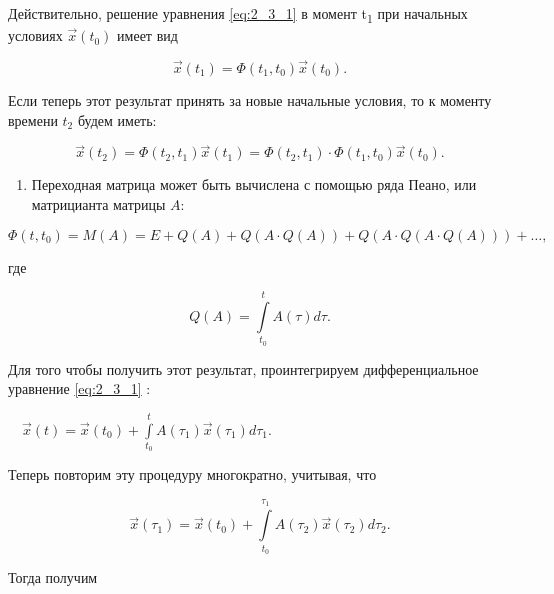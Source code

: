 		Действительно, решение уравнения \eqref{eq:2_3_1} %
		в момент {t}\textsubscript{1} при начальных условиях  $\vec x(t_0)$
		имеет вид


\begin{equation*}
\vec x(t_1)=\Phi (t_1,t_0)\vec x(t_0).
\end{equation*}

		Если теперь этот результат принять за новые начальные условия, то к моменту времени  $t_2$ будем иметь:


\begin{equation*}
\vec x(t_2)=\Phi (t_2,t_1)\vec x(t_1)=\Phi (t_2,t_1)\cdot \Phi (t_1,t_0)\vec x(t_0).
\end{equation*}
\liststyleWWviiiNumlxviii
\setcounter{saveenum}{\value{enumi}}
\begin{enumerate}
	\setcounter{enumi}{\value{saveenum}}
	\item 
			Переходная матрица может быть вычислена с помощью ряда Пеано, или матрицианта матрицы  $A$:
	
\end{enumerate}
\begin{equation*}
\Phi (t,t_0)=M(A)=E+Q(A)+Q(A\cdot Q(A))+Q(A\cdot Q(A\cdot Q(A)))+\ldots ,
\end{equation*}

		где


\begin{equation*}
Q(A)=\overset t{\underset{t_0}{\int }}A(\tau )\mathit{d\tau }.
\end{equation*}

		Для того чтобы получить этот результат, проинтегрируем дифференциальное уравнение \eqref{eq:2_3_1} %
		:



		\ \  $\vec x(t)=\vec x(t_0)+\overset t{\underset{t_0}{\int }}A(\tau _1)\vec x(\tau _1)\mathit{d\tau }_1$.



		Теперь повторим эту процедуру многократно, учитывая, что


\begin{equation*}
\vec x(\tau _1)=\vec x(t_0)+\overset{\tau _1}{\underset{t_0}{\int }}A(\tau _2)\vec x(\tau _2)\mathit{d\tau }_2.
\end{equation*}

		Тогда получим


